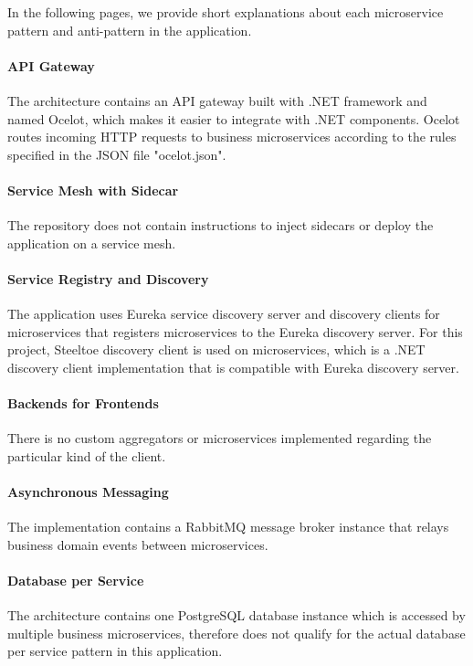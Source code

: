 \documentclass{Configuration_Files/PoliMi3i_thesis}
\begin{document}
In the following pages, we provide short explanations about each microservice pattern and anti-pattern in the application.

\paragraph{API Gateway} The architecture contains an API gateway built with .NET framework and named Ocelot\footnotemark[103], which makes it easier to integrate with .NET components.
Ocelot routes incoming HTTP requests to business microservices according to the rules specified in the JSON file "ocelot.json".

\paragraph{Service Mesh with Sidecar} The repository does not contain instructions to inject sidecars or deploy the application on a service mesh.

\paragraph{Service Registry and Discovery} The application uses Eureka service discovery server and discovery clients for microservices that registers microservices to the Eureka discovery server.
For this project, Steeltoe\footnotemark[104] discovery client is used on microservices, which is a .NET discovery client implementation that is compatible with Eureka discovery server.

\paragraph{Backends for Frontends} There is no custom aggregators or microservices implemented regarding the particular kind of the client.

\paragraph{Asynchronous Messaging} The implementation contains a RabbitMQ message broker instance that relays business domain events between microservices.

\paragraph{Database per Service} The architecture contains one PostgreSQL database instance which is accessed by multiple business microservices, therefore does not qualify for the actual database per service pattern in this application.
\end{document}
